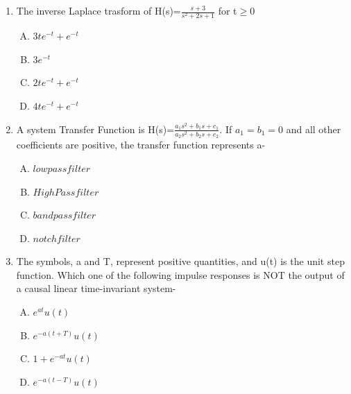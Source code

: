 \documentclass[journal,12pt,twocolumn]{IEEEtran}
\begin{document}
\begin{enumerate}
\setlength\itemsep{2em}

\item The inverse Laplace trasform of H(s)=$\frac{s+3}{s^2+2s+1}$ for t$\geq$0
\begin{enumerate}[(A)]

\setlength\itemsep{0.5em}

\item $ 3te^{-t}+e^{-t}  $
\item $3e^{-t}$

\item $ 2te^{-t}+e^{-t}  $

\item $ 4te^{-t}+e^{-t}  $

\end{enumerate}

\item A system Transfer Function is H(s)=$\frac{a_1s^2+b_1s+c_1}{a_2s^2+b_2s+c_2}$. If $a_1=b_1=0$ and all other coefficients are positive, the transfer function represents a-
\begin{enumerate}[(A)]

\setlength\itemsep{0.5em}

\item $ low pass filter $
\item $High Pass filter$

\item $ band pass filter  $

\item $ notch filter$

\end{enumerate}

\item The symbols, a and T, represent positive quantities, and u(t) is the unit step function. Which one of the following impulse responses is NOT the output of a causal linear time-invariant system-

\begin{enumerate}[(A)]

\setlength\itemsep{0.5em}

\item $ e^{at}u(t)$
\item $ e^{-a(t+T)}u(t)$

\item $ 1+e^{-at}u(t) $

\item $ e^{-a(t-T)}u(t) $

\end{enumerate}


\end{enumerate}
\end{document}
